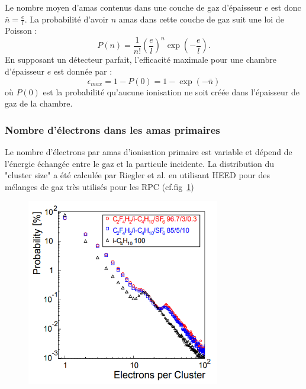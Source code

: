 Le nombre moyen d'amas contenus dans une couche de gaz d'épaisseur $e$ est donc $\bar{n}=\frac{e}{l}$. La probabilité d'avoir $n$ amas dans cette couche de gaz suit une loi de Poisson :
\begin{equation}
P(n)=\frac{1}{n!}\left(\frac{e}{l}\right)^{n}\exp\left(-\frac{e}{l}\right).
\end{equation}
En supposant un détecteur parfait, l'efficacité maximale pour une chambre d'épaisseur $e$ est donnée par :
\begin{equation}
\epsilon_{max}=1-P(0)=1-\exp\left(-\bar{n}\right)
\end{equation}
où $P(0)$ est la probabilité qu'aucune ionisation ne soit créée dans l'épaisseur de gaz de la chambre.

\subsubsection{Nombre d'électrons dans les amas primaires}
Le nombre d'électrons par amas d'ionisation primaire est variable et dépend de l'énergie échangée entre le gaz et la particule incidente. La distribution du "cluster size" a été calculée par Riegler et al. \cite{Riegler:570462} en utilisant HEED pour des mélanges de gaz très utilisés pour les RPC (cf.fig~\ref{cluster})
\begin{figure}[h!]
	\centering
	\includegraphics[width=0.75\textwidth]{RPC/cluster.png}
	\label{cluster}
\end{figure}

